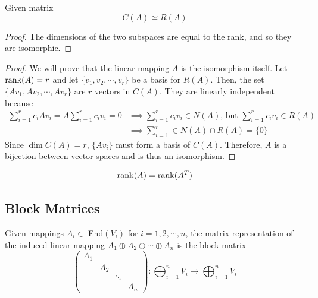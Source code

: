 	\begin{theorem}
	  \label{thm:column-and-row-spaces-are-isomorphic}
		Given matrix 
    \begin{equation}
      C(A) \simeq R(A)
    \end{equation}
  \end{theorem}
	\begin{proof}
	  The dimensions of the two subspaces are equal to the rank, and so they are isomorphic. 
	\end{proof}
  \begin{proof}
		We will prove that the linear mapping $A$ is the isomorphism itself. Let $\operatorname{rank}(A) = r$ and let $\{ v_1, v_2, \cdots, v_r\}$ be a basis for $R(A)$. Then, the set $\{ A v_1, A v_2, \cdots, A v_r\}$ are $r$ vectors in $C(A)$. They are linearly independent because 
    \begin{align*}
      \sum_{i = 1}^r c_i A v_i = A \sum_{i=1}^r c_i v_i = 0 & \implies \sum_{i=1}^r c_i v_i \in N(A) \text{, but } \sum_{i=1}^r c_i v_i \in R(A) \\
      & \implies \sum_{i=1}^r \in N(A) \cap R(A) = \{0\}
    \end{align*} 
    Since $\dim C(A) = r$, $\{A v_i\}$ must form a basis of $C(A)$. Therefore, $A$ is a bijection between \hyperref[def:vector-space]{vector spaces} and is thus an isomorphism. 
  \end{proof}

  \begin{corollary}
    \label{thm:row-rank-equals-column-rank}
    \begin{equation}
      \operatorname{rank}(A) = \operatorname{rank}(A^T)
    \end{equation}
  \end{corollary}

\subsection{Block Matrices}

  \begin{theorem}
    \label{thm:matrix-of-an-induced-map-on-a-direct-sum}
    Given mappings $A_i \in$ End$(V_i)$ for $i = 1, 2, \cdots, n$, the matrix representation of the induced linear mapping $A_1 \oplus A_2 \oplus \cdots \oplus A_n$ is the block matrix 
    \begin{equation}
      \begin{pmatrix}
      A_1 & & & \\
      & A_2 & & \\
      & & \ddots & \\
      & & & A_n
      \end{pmatrix}: \bigoplus_{i=1}^n V_i \to \bigoplus_{i=1}^n V_i
    \end{equation}
  \end{theorem}

